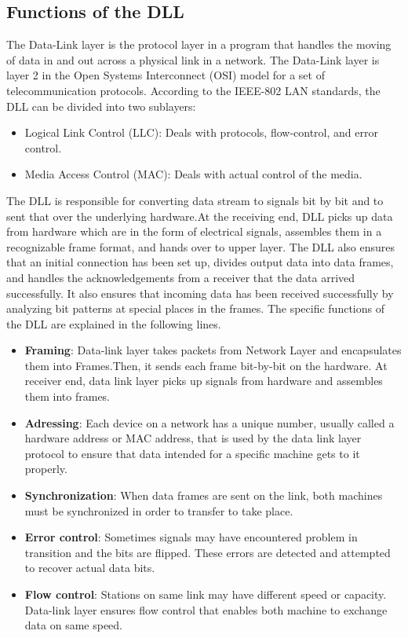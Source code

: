 \subsection{Functions of the DLL}
The Data-Link layer is the protocol layer in a program that handles the moving of data in and out across a physical link in a network. The Data-Link layer is layer 2 in the Open Systems Interconnect (OSI) model for a set of telecommunication protocols. According to the IEEE-802 LAN standards, the DLL can be divided into two sublayers:
\begin{itemize}
\item Logical Link Control (LLC): Deals with protocols, flow-control, and error control.
\item Media Access Control (MAC): Deals with actual control of the media.
\end{itemize}
The DLL is responsible for converting data stream to signals bit by bit and to sent that over the underlying hardware.At the receiving end, DLL picks up data from hardware which are in the form of electrical signals, assembles them in a recognizable frame format, and hands over to upper layer. The DLL also ensures that an initial connection has been set up, divides output data into data frames, and handles the acknowledgements from a receiver that the data arrived successfully. It also ensures that incoming data has been received successfully by analyzing bit patterns at special places in the frames. The specific functions of the DLL are explained in the following lines.
\begin{itemize}
\item \textbf{Framing}: Data-link layer takes packets from Network Layer and encapsulates them into Frames.Then, it sends each frame bit-by-bit on the hardware. At receiver end, data link layer picks up signals from hardware and assembles them into frames.
\item \textbf{Adressing}: Each device on a network has a unique number, usually called a hardware address or MAC address, that is used by the data link layer protocol to ensure that data intended for a specific machine gets to it properly.
\item \textbf{Synchronization}: When data frames are sent on the link, both machines must be synchronized in order to transfer to take place.
\item \textbf{Error control}: Sometimes signals may have encountered problem in transition and the bits are flipped. These errors are detected and attempted to recover actual data bits.
\item \textbf{Flow control}: Stations on same link may have different speed or capacity. Data-link layer ensures flow control that enables both machine to exchange data on same speed. 
 \end{itemize}
